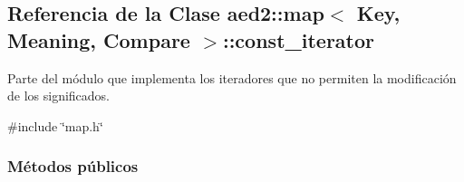 \hypertarget{classaed2_1_1map_1_1const__iterator}{}\subsection{Referencia de la Clase aed2\+:\+:map$<$ Key, Meaning, Compare $>$\+:\+:const\+\_\+iterator}
\label{classaed2_1_1map_1_1const__iterator}


Parte del módulo que implementa los iteradores que no permiten la modificación de los significados.  




{\ttfamily \#include \char`\"{}map.\+h\char`\"{}}

\subsubsection*{Métodos públicos}
